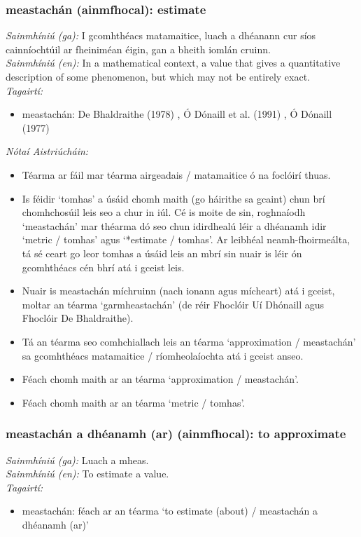 \subsubsection*{meastachán (ainmfhocal): estimate}
 \noindent \textit{Sainmhíniú (ga):} I gcomhthéacs matamaitice, luach a dhéanann cur síos cainníochtúil ar fheiniméan éigin, gan a bheith iomlán cruinn.
\\
 \noindent \textit{Sainmhíniú (en):} In a mathematical context, a value that gives a quantitative description of some phenomenon, but which may not be entirely exact.
\\
 \noindent \textit{Tagairtí:}
\begin{itemize}
	\item meastachán: De Bhaldraithe (1978) \cite{de-bhaldraithe}, Ó Dónaill et al. (1991) \cite{focloir-beag}, Ó Dónaill (1977) \cite{odonaill}
\end{itemize}

 \noindent \textit{Nótaí Aistriúcháin:}
\begin{itemize}
	\item Téarma ar fáil mar téarma airgeadais / matamaitice ó na foclóirí thuas.
	\item Is féidir `tomhas' a úsáid chomh maith (go háirithe sa gcaint) chun brí chomhchosúil leis seo a chur in iúl. Cé is moite de sin, roghnaíodh `meastachán' mar théarma dó seo chun idirdhealú léir a dhéanamh idir `metric / tomhas' agus `*estimate / tomhas'. Ar leibhéal neamh-fhoirmeálta, tá sé ceart go leor tomhas a úsáid leis an mbrí sin nuair is léir ón gcomhthéacs cén bhrí atá i gceist leis.
	\item Nuair is meastachán míchruinn (nach ionann agus mícheart) atá i gceist, moltar an téarma `garmheastachán' (de réir Fhoclóir Uí Dhónaill agus Fhoclóir De  Bhaldraithe).
	\item Tá an téarma seo comhchiallach leis an téarma `approximation / meastachán' sa gcomhthéacs matamaitice / ríomheolaíochta atá i gceist anseo.
	\item Féach chomh maith ar an téarma `approximation / meastachán'.
	\item Féach chomh maith ar an téarma `metric / tomhas'.
\end{itemize}


\subsubsection*{meastachán a dhéanamh (ar) (ainmfhocal): to approximate}
 \noindent \textit{Sainmhíniú (ga):} Luach a mheas.
\\
 \noindent \textit{Sainmhíniú (en):} To estimate a value.
\\
 \noindent \textit{Tagairtí:}
\begin{itemize}
	\item meastachán: féach ar an téarma `to estimate (about) / meastachán a dhéanamh (ar)'
\end{itemize}

